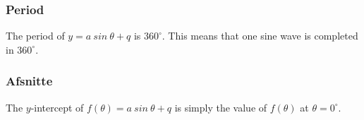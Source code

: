 
\subsubsection*{Period}
The period of $y=a~sin~\theta+q$ is $360^{\circ}$. This means that one sine wave is completed in $360^{\circ}$. 


\subsubsection*{Afsnitte}
\nopagebreak
The $y$-intercept of $f(\theta )=a~sin~\theta+q$ is simply the value of $f(\theta )$ at $\theta =0^{\circ }$.

